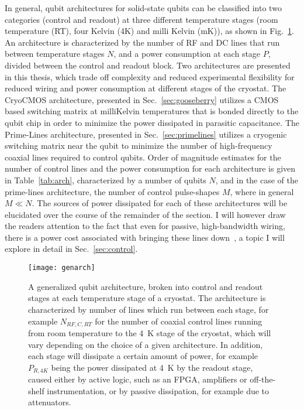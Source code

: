 In general, qubit architectures for solid-state qubits can be classified into two categories (control and readout) at three different temperature stages
(room temperature (RT), four Kelvin (4K) and milli Kelvin (mK)), as shown in Fig.~\ref{fig:genarch}. An
architecture is characterized by the number of RF and DC lines that run between temperature stages $N$, and a power consumption at each stage $P$, divided between the control
and readout block. Two architectures are presented in this thesis, which trade off complexity and reduced experimental flexibility for reduced wiring and power consumption
at different stages of the cryostat. The CryoCMOS architecture, presented in Sec.~\ref{sec:gooseberry} utilizes a CMOS based switching matrix at milliKelvin temperatures that is
bonded directly to the qubit chip in order to minimize the power dissipated in parasitic capacitance. The Prime-Lines architecture, presented in Sec.~\ref{sec:primelines}
utilizes a cryogenic switching matrix near the qubit to minimize the number of high-frequency coaxial lines required to control qubits. Order of magnitude estimates
for the number of control lines and the power consumption for each architecture is given in Table~\ref{tab:arch}, characterized by a number of qubits $N$,
and in the case of the prime-lines architecture, the number of control pulse-shapes $M$, where in general $M \ll N$. The sources of power dissipated for each of these architectures
will be elucidated over the course of the remainder of the section. I will however draw the readers attention to the fact that even for passive, high-bandwidth wiring, there is a
power cost associated with bringing these lines down~\cite{Krinner2019}, a topic I will explore in detail in Sec.~\ref{sec:control}.

\begin{figure}
  \texttt{[image: genarch]}
  \caption[Generalized quantum computing architecture]
  {\label{fig:genarch}A generalized qubit architecture, broken into control and readout stages at each temperature stage of a cryostat. The architecture is characterized by number of lines which run between each stage, for example $N_{RF,C,RT}$ for the number of coaxial control lines running from room temperature to the \SI{4}{\kelvin} stage of the cryostat, which will vary depending on the choice of a given architecture. In addition, each stage will dissipate a certain amount of power, for example $P_{R,4K}$ being the power dissipated at \SI{4}{\kelvin} by the readout stage, caused either by active logic, such as an FPGA, amplifiers or off-the-shelf instrumentation, or by passive dissipation, for example due to attenuators.}
\end{figure}


